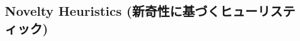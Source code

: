 \documentclass[b5paper]{report}
\begin{document}
\subsection{Novelty Heuristics (新奇性に基づくヒューリスティック)}
\label{sec:novelty-heuristics}

\end{document}
